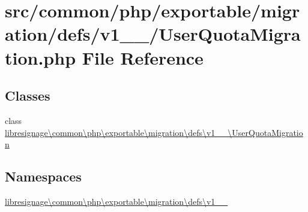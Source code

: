 \hypertarget{v1__0__0_2UserQuotaMigration_8php}{}\section{src/common/php/exportable/migration/defs/v1\+\_\+\_/\+User\+Quota\+Migration.php File Reference}
\label{v1__0__0_2UserQuotaMigration_8php}
\subsection*{Classes}
\begin{DoxyCompactItemize}
\item 
class \hyperlink{classlibresignage_1_1common_1_1php_1_1exportable_1_1migration_1_1defs_1_1v1__0__0_1_1UserQuotaMigration}{libresignage\textbackslash{}common\textbackslash{}php\textbackslash{}exportable\textbackslash{}migration\textbackslash{}defs\textbackslash{}v1\+\_\+\_\textbackslash{}\+User\+Quota\+Migration}
\end{DoxyCompactItemize}
\subsection*{Namespaces}
\begin{DoxyCompactItemize}
\item 
 \hyperlink{namespacelibresignage_1_1common_1_1php_1_1exportable_1_1migration_1_1defs_1_1v1__0__0}{libresignage\textbackslash{}common\textbackslash{}php\textbackslash{}exportable\textbackslash{}migration\textbackslash{}defs\textbackslash{}v1\+\_\+\_}
\end{DoxyCompactItemize}
